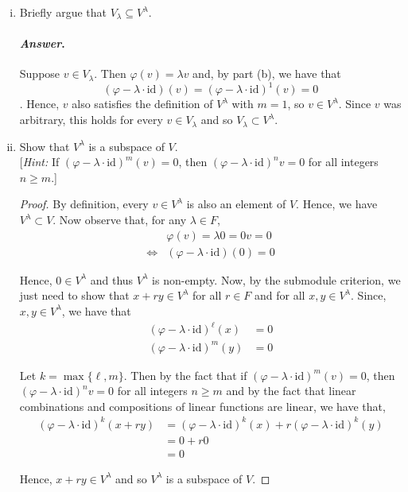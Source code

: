 \documentclass[11pt, reqno]{amsart}
\theoremstyle{plain}
\theoremstyle{definition}
\theoremstyle{example}
\newenvironment{ans}{\medskip \paragraph*{\emph{Answer}.}}{\hfill \break  $~\!\!$ \dotfill \medskip }
\def\id{\mathrm{id}}
\def\f{\varphi}
\begin{document}
\begin{enumerate}[1.]
\begin{enumerate}[(a)]
\begin{enumerate}[(i)]
\begin{ans}
As a result, we have that $(\f - 2 \cdot \id)^2(v) = 0$, and so $v \in V^2$

\end{ans}	
	
\item Briefly argue that $V_\lambda \subseteq V^\lambda$.
\begin{ans}
Suppose $v \in V_{\lambda}$. Then $\f(v) = \lambda v$ and, by part (b), we have that $$(\f - \lambda \cdot \id)(v) = (\f - \lambda \cdot \id)^1(v) = 0$$. Hence, $v$ also satisfies the definition of $V^{\lambda}$ with $m = 1$, so $v \in V^{\lambda}$. Since $v$ was arbitrary, this holds for every $v \in V_{\lambda}$ and so $V_{\lambda} \subset V^{\lambda}$.
\end{ans}
\item Show that $V^\lambda$ is a subspace of $V$. \\
	{[\emph{Hint:} If $(\f - \lambda \cdot \id)^m (v) = 0$, then $(\f - \lambda \cdot \id)^n v = 0$ for all integers $n \ge m$.]}


\begin{proof}
By definition, every $v \in V^{\lambda}$ is also an element of $V$. Hence, we have $V^{\lambda} \subset V$. Now observe that, for any $\lambda \in F$,
\begin{align*}
&\f(v) = \lambda 0 = 0v = 0\\
\iff &(\f - \lambda \cdot \id)(0) = 0
\end{align*} 

Hence, $0 \in V^{\lambda}$ and thus $V^\lambda$ is non-empty. Now, by the submodule criterion, we just need to show that $x + ry \in V^{\lambda}$ for all $r \in F$ and for all $x, y \in V^{\lambda}$. Since, $x, y \in V^{\lambda}$, we have that 
\begin{align*}
(\f - \lambda \cdot \id)^{\ell}(x) &= 0\\
(\f - \lambda \cdot \id)^{m}(y) &= 0
\end{align*}

Let $k = \max\{\ell, m\}$. Then by the fact that if $(\f - \lambda \cdot \id)^m (v) = 0$, then $(\f - \lambda \cdot \id)^n v = 0$ for all integers $n \ge m$ and by the fact that linear combinations and compositions of linear functions are linear, we have that,
\begin{align*}
(\f - \lambda \cdot \id)^k (x + ry) &= (\f - \lambda \cdot \id)^k(x) + r (\f - \lambda \cdot \id)^k(y)\\
&= 0 + r0\\
&= 0
\end{align*}

Hence, $x + ry \in V^{\lambda}$ and so $V^{\lambda}$ is a subspace of $V$.
\end{proof}

\end{enumerate}



\end{enumerate}
\end{enumerate}
\end{document}
